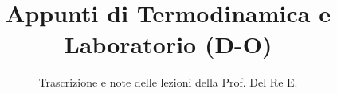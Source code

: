 \documentclass[a4paper,12pt]{article}
\title{Appunti di Termodinamica e Laboratorio (D-O)}
\author{Trascrizione e note delle lezioni della Prof. Del Re E.}
\date{}
\begin{document}
\maketitle
\projectintro
\tableofcontents
\newpage

\end{document}
